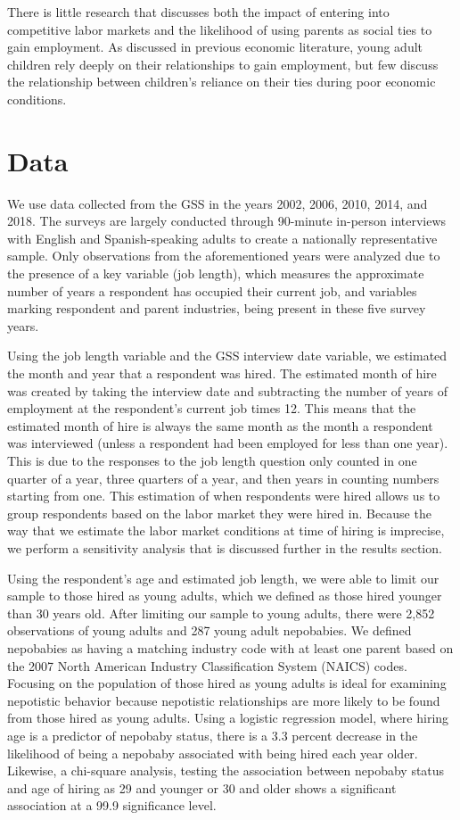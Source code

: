 \documentclass[12pt]{article}
\begin{document}
There is little research that discusses both the impact of entering into competitive labor markets and the likelihood of using parents as social ties to gain employment. As discussed in previous economic literature, young adult children rely deeply on their relationships to gain employment, but few discuss the relationship between children’s reliance on their ties during poor economic conditions.


\section{Data}
\label{sec:data}
We use data collected from the GSS in the years 2002, 2006, 2010, 2014, and 2018. The surveys are largely conducted through 90-minute in-person interviews with English and Spanish-speaking adults to create a nationally representative sample. Only observations from the aforementioned years were analyzed due to the presence of a key variable (job length), which measures the approximate number of years a respondent has occupied their current job, and variables marking respondent and parent industries, being present in these five survey years. 

Using the job length variable and the GSS interview date variable, we estimated the month and year that a respondent was hired. The estimated month of hire was created by taking the interview date and subtracting the number of years of employment at the respondent's current job times 12. This means that the estimated month of hire is always the same month as the month a respondent was interviewed (unless a respondent had been employed for less than one year). This is due to the responses to the job length question only counted in one quarter of a year, three quarters of a year, and then years in counting numbers starting from one. This estimation of when respondents were hired allows us to group respondents based on the labor market they were hired in. Because the way that we estimate the labor market conditions at time of hiring is imprecise, we perform a sensitivity analysis that is discussed further in the results section.

Using the respondent’s age and estimated job length, we were able to limit our sample to those hired as young adults, which we defined as those hired younger than 30 years old. After limiting our sample to young adults, there were 2,852  observations of young adults and 287 young adult nepobabies. We defined nepobabies as having a matching industry code with at least one parent based on the 2007 North American Industry Classification System (NAICS) codes. Focusing on the population of those hired as young adults is ideal for examining nepotistic behavior because nepotistic relationships are more likely to be found from those hired as young adults. Using a logistic regression model, where hiring age is a predictor of nepobaby status, there is a 3.3 percent decrease in the likelihood of being a nepobaby associated with being hired each year older. Likewise, a chi-square analysis, testing the association between nepobaby status and age of hiring as 29 and younger or 30 and older shows a significant association at a 99.9 significance level.
\end{document}
